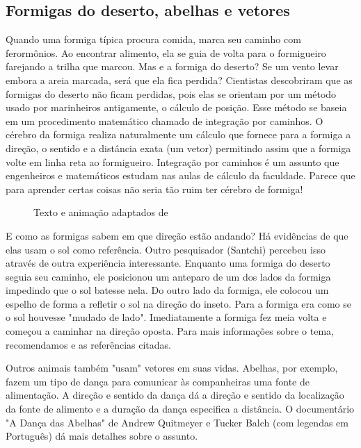 \subsection{Formigas do deserto, abelhas e vetores}
\label{\detokenize{GE101-E:formigas-do-deserto-abelhas-e-vetores}}
Quando uma formiga típica procura comida, marca seu caminho com ferormônios. Ao encontrar alimento, ela se guia de volta para o formigueiro farejando a trilha que marcou. Mas e a formiga do deserto? Se um vento levar embora a areia marcada, será que ela fica perdida? Cientistas \citet{wehner1981} descobriram que as formigas do deserto não ficam perdidas, pois elas se orientam por um método usado por marinheiros antigamente, o cálculo de posição. Esse método se baseia em um procedimento matemático chamado de integração por caminhos. O cérebro da formiga realiza naturalmente um cálculo que fornece para a formiga a direção, o sentido e a distância exata (um vetor) permitindo assim que a formiga volte em linha reta ao formigueiro. Integração por caminhos é um assunto que engenheiros e matemáticos estudam nas aulas de cálculo da faculdade. Parece que para aprender certas coisas não seria tão ruim ter cérebro de formiga!

\begin{figure}[H]
\centering
\capstart

\caption{Texto e animação adaptados de \citet{gomes2010}}\end{figure}

E como as formigas sabem em que direção estão andando? Há evidências de que elas usam o sol como referência. Outro pesquisador (Santchi) percebeu isso através de outra experiência interessante. Enquanto uma formiga do deserto seguia seu caminho, ele posicionou um anteparo de um dos lados da formiga impedindo que o sol batesse nela. Do outro lado da formiga, ele colocou um espelho de forma a refletir o sol na direção do inseto. Para a formiga era como se o sol houvesse "mudado de lado". Imediatamente a formiga fez meia volta e começou a caminhar na direção oposta. Para mais informações sobre o tema, recomendamos \citep{gomes2010} e as referências citadas.

Outros animais também "usam"{} vetores em suas vidas. Abelhas, por exemplo, fazem um tipo de dança para comunicar às companheiras uma fonte de alimentação. A direção e sentido da dança dá a direção e sentido da localização da fonte de alimento e a duração da dança especifica a distância. O documentário "A Dança das Abelhas"{} de Andrew Quitmeyer e Tucker Balch (com legendas em Português) dá mais detalhes sobre o assunto.

